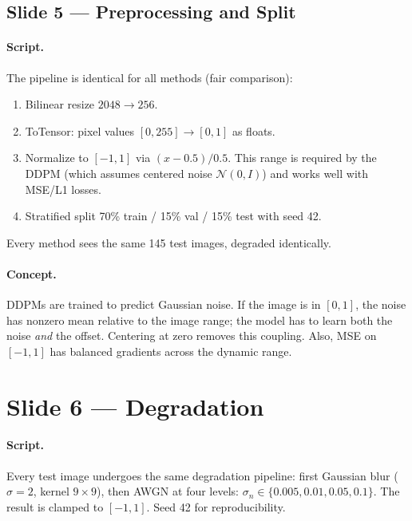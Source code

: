 \documentclass[english,11pt,a4paper]{article}
\begin{document}
\subsection{Slide 5 --- Preprocessing and Split}

\paragraph{Script.}
The pipeline is identical for all methods (fair comparison):
\begin{enumerate}
\item Bilinear resize $2048\to256$.
\item ToTensor: pixel values $[0,255] \to [0,1]$ as floats.
\item Normalize to $[-1,1]$ via $(x-0.5)/0.5$. This range is required
by the DDPM (which assumes centered noise $\mathcal{N}(0,I)$) and works
well with MSE/L1 losses.
\item Stratified split 70\% train / 15\% val / 15\% test with seed 42.
\end{enumerate}
Every method sees the same 145 test images, degraded identically.

\paragraph{Concept.}
DDPMs are trained to predict Gaussian noise. If the image is in $[0,1]$,
the noise has nonzero mean relative to the image range; the model has
to learn both the noise \emph{and} the offset. Centering at zero
removes this coupling. Also, MSE on $[-1,1]$ has balanced gradients
across the dynamic range.

\section{Slide 6 --- Degradation}

\paragraph{Script.}
Every test image undergoes the same degradation pipeline: first Gaussian
blur ($\sigma=2$, kernel $9\times9$), then AWGN at four levels:
$\sigma_n \in \{0.005, 0.01, 0.05, 0.1\}$. The result is clamped to
$[-1,1]$. Seed 42 for reproducibility.
\end{document}
